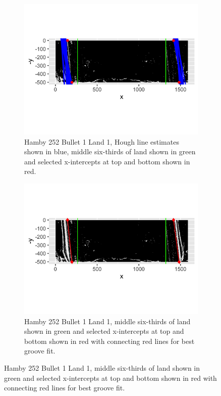 \documentclass[12pt]{article}
\theoremstyle{nonumberplain}
\begin{document}
\begin{figure}[!ht]
    \centering
      \begin{subfigure}[t]{.45\textwidth}
      \centering
      \includegraphics[width = .9\textwidth]{../images/Hamby252_Bullet1_Land1_hough_lines_process_step_two}
      \caption{Hamby 252 Bullet 1 Land 1, Hough line estimates shown in blue, middle six-thirds of land shown in green and selected x-intercepts at top and bottom shown in red.}
      \label{fig: step-two}
      \end{subfigure}\hfill
    \begin{subfigure}[t]{.45\textwidth}
      \centering
      \includegraphics[width = .9\textwidth]{../images/Hamby252_Bullet1_Land1_hough_lines_process_step_three}
      \caption{Hamby 252 Bullet 1 Land 1, middle six-thirds of land shown in green and selected x-intercepts at top and bottom shown in red with connecting red lines for best groove fit.}
      \label{fig: step-three}
      \end{subfigure}
      \label{fig: hough-compare}
\end{figure}
\end{document}
